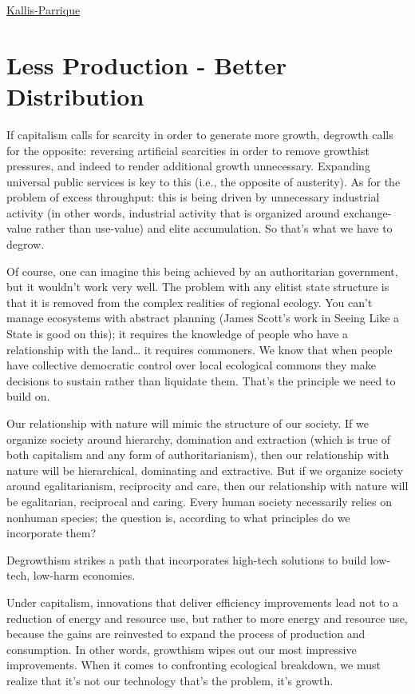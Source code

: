\documentclass[
]{book}
\begin{document}
\href{https://braveneweurope.com/timothee-parrique-giorgos-kallis-degrowth-socialism-without-growth}{Kallis-Parrique}

\hypertarget{less-production---better-distribution}{%
\section{Less Production - Better Distribution}\label{less-production---better-distribution}}

If capitalism calls for scarcity in order to generate more growth, degrowth calls for the opposite: reversing artificial scarcities in order to remove growthist pressures, and indeed to render additional growth unnecessary. Expanding universal public services is key to this (i.e., the opposite of austerity). As for the problem of excess throughput: this is being driven by unnecessary industrial activity (in other words, industrial activity that is organized around exchange-value rather than use-value) and elite accumulation. So that's what we have to degrow.

Of course, one can imagine this being achieved by an authoritarian government, but it wouldn't work very well. The problem with any elitist state structure is that it is removed from the complex realities of regional ecology. You can't manage ecosystems with abstract planning (James Scott's work in Seeing Like a State is good on this); it requires the knowledge of people who have a relationship with the land\ldots{} it requires commoners. We know that when people have collective democratic control over local ecological commons they make decisions to sustain rather than liquidate them. That's the principle we need to build on.

Our relationship with nature will mimic the structure of our society. If we organize society around hierarchy, domination and extraction (which is true of both capitalism and any form of authoritarianism), then our relationship with nature will be hierarchical, dominating and extractive. But if we organize society around egalitarianism, reciprocity and care, then our relationship with nature will be egalitarian, reciprocal and caring. Every human society necessarily relies on nonhuman species; the question is, according to what principles do we incorporate them?

Degrowthism strikes a path that incorporates high-tech solutions
to build low-tech, low-harm economies.

Under capitalism, innovations that deliver efficiency improvements lead not to a reduction of energy and resource use, but rather to more energy and resource use, because the gains are reinvested to expand the process of production and consumption. In other words, growthism wipes out our most impressive improvements. When it comes to confronting ecological breakdown, we must realize that it's not our technology that's the problem, it's growth.
\end{document}
